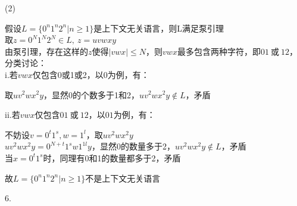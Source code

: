 \documentclass[a4paper,12pt,oneside,final,titlepage]{article}
\begin{document}
\begin{adjustwidth}{2em}{}
\begin{adjustwidth}{2em}{}
\end{adjustwidth}
(2)
\begin{adjustwidth}{2em}{}
假设$L = \{0^n1^n2^n|n\geq 1\}$是上下文无关语言，则L满足泵引理 \\
取$z = 0^N1^N2^N\in L,\ z = uvwxy$\\
由泵引理，存在这样的$z$使得$|vwx|\leq N$，则$vwx$最多包含两种字符，即$01\ \text{或}\ 12$，分类讨论：\\
i.若$vwx$仅包含0或1或2，以0为例，有：
\begin{adjustwidth}{2em}{}
取$uv^2wx^2y$，显然0的个数多于1和2，$uv^2wx^2y\notin L$，矛盾
\end{adjustwidth}
ii.若$vwx$仅包含$01\ \text{或}\ 12$，以$01$为例，有：
\begin{adjustwidth}{2em}{}
不妨设$v = 0^t1^s, w = 1^l$，取$uv^2wx^2y$ \\
$uv^2wx^2y = 0^{N+t}1^sw1^{1l}y$，显然0的数量多于2，$uv^2wx^2y\notin L$，矛盾 \\
当$x = 0^t1^s$时，同理有0和1的数量都多于2，矛盾
\end{adjustwidth}
故$L = \{0^n1^n2^n|n\geq 1\}$不是上下文无关语言
\end{adjustwidth}
\end{adjustwidth}
6.
\end{document}
